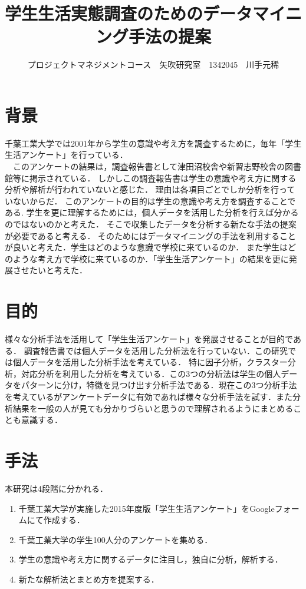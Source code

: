 \documentclass[uplatex,twocolumn,dvipdfmx]{jsarticle}
\title{\vspace{-5mm}\fontsize{14pt}{0pt}\selectfont 学生生活実態調査のためのデータマイニング手法の提案}
\author{\normalsize プロジェクトマネジメントコース　矢吹研究室　1342045　川手元稀}
\date{}
\begin{document}
\fontsize{10.5pt}{\baselineskip}\selectfont
\maketitle





\section{背景}
千葉工業大学では2001年から学生の意識や考え方を調査するために，毎年「学生生活アンケート」を行っている．
\\\ \ このアンケートの結果は，調査報告書として津田沼校舎や新習志野校舎の図書館等に掲示されている．
しかしこの調査報告書は学生の意識や考え方に関する分析や解析が行われていないと感じた．
理由は各項目ごとでしか分析を行っていないからだ．
このアンケートの目的は学生の意識や考え方を調査することである\cite{a}.
学生を更に理解するためには，個人データを活用した分析を行えば分かるのではないのかと考えた．
そこで収集したデータを分析する新たな手法の提案が必要であると考える．
そのためにはデータマイニングの手法を利用することが良いと考えた．学生はどのような意識で学校に来ているのか．
また学生はどのような考え方で学校に来ているのか．「学生生活アンケート」の結果を更に発展させたいと考えた．


\section{目的}
様々な分析手法を活用して「学生生活アンケート」を発展させることが目的である．
調査報告書では個人データを活用した分析法を行っていない．この研究では個人データを活用した分析手法を考えている．
特に因子分析，クラスター分析，対応分析を利用した分析を考えている．この3つの分析法は学生の個人データをパターンに分け，特徴を見つけ出す分析手法である\cite{b}．現在この3つ分析手法を考えているがアンケートデータに有効であれば様々な分析手法を試す．また分析結果を一般の人が見ても分かりづらいと思うので理解されるようにまとめることも意識する．


\section{手法}
本研究は4段階に分かれる．

\begin{enumerate}
\item 千葉工業大学が実施した2015年度版「学生生活アンケート」をGoogleフォームにて作成する．
\item 千葉工業大学の学生100人分のアンケートを集める．
\item 学生の意識や考え方に関するデータに注目し，独自に分析，解析する．
\item 新たな解析法とまとめ方を提案する．
\end{enumerate}
\end{document}

